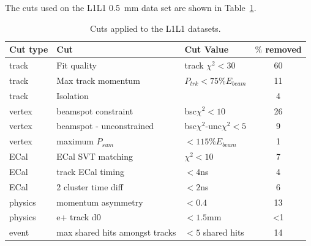  The cuts used on the L1L1 0.5~mm data set are shown in Table~\ref{tab:l1l1_cuts}.

\begin{table}[htb]
\caption{Cuts applied to the L1L1 datasets.}
\label{tab:l1l1_cuts}
\centering
\begin{tabular}{lllc}
\toprule
Cut type & Cut & Cut Value &  $\%$ removed\\
\midrule
track & Fit quality & track $\chi^{2}<30$ & 60 \\
track & Max track momentum &  $P_{trk}<75\%E_{beam}$ & 11 \\
track & Isolation &   & 4  \\
vertex & beamspot constraint & bsc$\chi^{2}<10$  & 26  \\
vertex & beamspot - unconstrained & bsc$\chi^{2}$-unc$\chi^2<5$  & 9 \\
vertex & maximum $P_{sum}$ &  $<115\%E_{beam}$ & 1 \\
ECal & ECal SVT matching & $\chi^2<10$  & 7  \\
ECal & track ECal timing & $<4$ns  & 4  \\
ECal & 2 cluster time diff & $<2$ns  & 6  \\
physics & momentum asymmetry & $<0.4$  & 13 \\
physics & e+ track d0 & $<1.5$mm  & <1 \\
event & max shared hits amongst tracks & $<5$ shared hits  & 14  \\
\bottomrule
\end{tabular}
\end{table}

